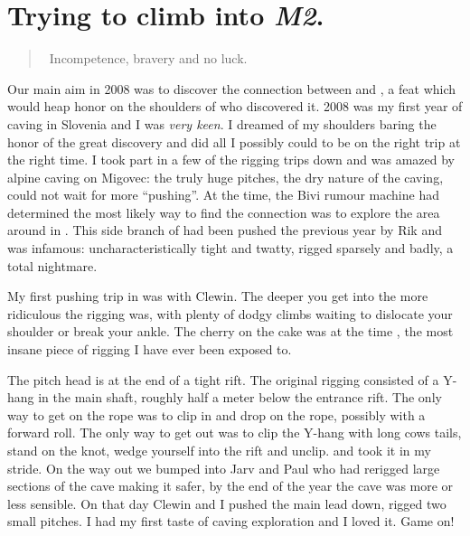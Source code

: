 \section{\texorpdfstring{Trying to climb into
\emph{M2}.}{Trying to climb into M2.}}

\begin{quote} Incompetence, bravery and no luck. \end{quote}

Our main aim in 2008 was to discover the connection between 
and , a feat which would heap honor on the
shoulders of who discovered it. 2008 was my first year of caving in
Slovenia and I was \textit{very keen}. I dreamed of my shoulders baring
the honor of the great discovery and did all I possibly could to be on
the right trip at the right time. I took part in a few of the rigging
trips down  and was amazed by alpine caving on Migovec: the
truly huge pitches, the dry nature of the caving, could not wait for
more ``pushing''. At the time, the Bivi rumour machine had determined
the most likely way to find the connection was to explore the area
around  in . This side branch
of  had been pushed the previous year by Rik and was
infamous: uncharacteristically tight and twatty, rigged sparsely and
badly, a total nightmare.




My first pushing trip in  was with Clewin. The
deeper you get into  the more ridiculous the
rigging was, with plenty of dodgy climbs waiting to dislocate your
shoulder or break your ankle. The cherry on the cake was at the time
, the most insane piece of rigging I have ever been
exposed to.

The pitch head is at the end of a tight rift. The original rigging
consisted of a Y-hang in the main shaft, roughly half a meter below the
entrance rift. The only way to get on the rope was to clip in and drop
on the rope, possibly with a forward roll. The only way to get out was
to clip the Y-hang with long cows tails, stand on the knot, wedge
yourself into the rift and unclip.  and took it in my stride. On the way out we bumped into Jarv
and Paul who had rerigged large sections of the cave making it safer, by
the end of the year the cave was more or less sensible. On that day
Clewin and I pushed the main lead down, rigged two small pitches. I had
my first taste of caving exploration and I loved it. Game on!


